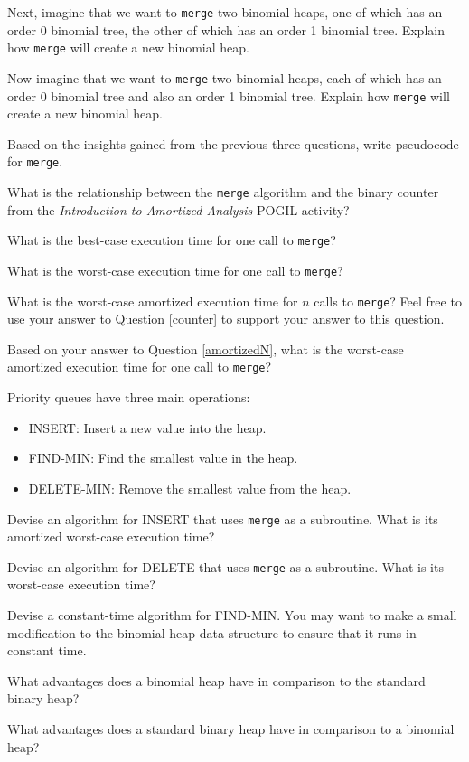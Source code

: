 \documentclass{tufte-handout}
\begin{document}
\begin{questions}
\item Next, imagine that we want to \verb|merge| two binomial heaps, one of which has an order 0 binomial tree, the other of which has an order 1 binomial tree. Explain how \verb|merge| will create a new binomial heap.

\item Now imagine that we want to \verb|merge| two binomial heaps, each of which has an order 0 binomial tree and also an order 1 binomial tree. Explain how \verb|merge| will create a new binomial heap.

\item Based on the insights gained from the previous three questions, write pseudocode for \verb|merge|.

\item What is the relationship between the \verb|merge| algorithm and the binary counter from the \emph{Introduction to Amortized Analysis} POGIL activity? \label{counter}

\item What is the best-case execution time for one call to \verb|merge|?

\item What is the worst-case execution time for one call to \verb|merge|?

\item What is the worst-case amortized execution time for $n$ calls to \verb|merge|? Feel free to use your answer to Question \ref{counter} to support your answer to this question. \label{amortizedN}

\item Based on your answer to Question \ref{amortizedN}, what is the worst-case amortized execution time for one call to \verb|merge|?

\item Priority queues have three main operations:
\begin{itemize}
    \item INSERT: Insert a new value into the heap.
    \item FIND-MIN: Find the smallest value in the heap.
    \item DELETE-MIN: Remove the smallest value from the heap.
\end{itemize}

Devise an algorithm for INSERT that uses \verb|merge| as a subroutine. What is its amortized worst-case execution time?

\item Devise an algorithm for DELETE that uses \verb|merge| as a subroutine. What is its worst-case execution time?

\item Devise a constant-time algorithm for FIND-MIN. You may want to make a small modification to the binomial heap data structure to ensure that it runs in constant time.

\item What advantages does a binomial heap have in comparison to the standard binary heap?

\item What advantages does a standard binary heap have in comparison to a binomial heap?

\end{questions}
\end{document}
